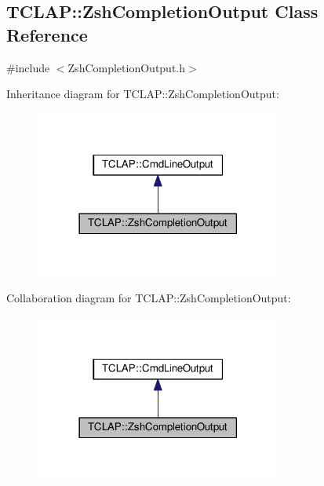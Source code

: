 \hypertarget{classTCLAP_1_1ZshCompletionOutput}{}\subsection{T\+C\+L\+AP\+:\+:Zsh\+Completion\+Output Class Reference}
\label{classTCLAP_1_1ZshCompletionOutput}


{\ttfamily \#include $<$Zsh\+Completion\+Output.\+h$>$}



Inheritance diagram for T\+C\+L\+AP\+:\+:Zsh\+Completion\+Output\+:
\nopagebreak
\begin{figure}[H]
\begin{center}
\leavevmode
\includegraphics[width=230pt]{classTCLAP_1_1ZshCompletionOutput__inherit__graph}
\end{center}
\end{figure}


Collaboration diagram for T\+C\+L\+AP\+:\+:Zsh\+Completion\+Output\+:
\nopagebreak
\begin{figure}[H]
\begin{center}
\leavevmode
\includegraphics[width=230pt]{classTCLAP_1_1ZshCompletionOutput__coll__graph}
\end{center}
\end{figure}
